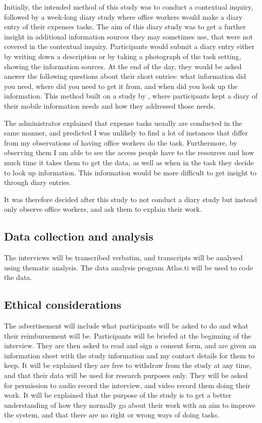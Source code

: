 \documentclass[11pt,oneside]{report}
\begin{document}
Initially, the intended method of this study was to conduct a contextual inquiry, followed by a week-long diary study where office workers would make a diary entry of their expenses tasks. The aim of this diary study was to get a further insight in additional information sources they may sometimes use, that were not covered in the contextual inquiry.  Participants would submit a diary entry either by writing down a description or by taking a photograph of the task setting, showing the information sources. At the end of the day, they would be asked answer the following questions about their short entries: what information did you need, where did you need to get it from, and when did you look up the information. This method built on a study by \citet{Sohn2008}, where participants kept a diary of their mobile information needs and how they addressed those needs. 

The administrator explained that expense tasks usually are conducted in the same manner, and predicted I was unlikely to find a lot of instances that differ from my observations of having office workers do the task.
Furthermore, by observing them I am able to see the access people have to the resources and how much time it takes them to get the data, as well as when in the task they decide to look up information. This information would be more difficult to get insight to through diary entries.

It was therefore decided after this study to not conduct a diary study but instead only observe office workers, and ask them to explain their work.

\subsection{Data collection and analysis}
The interviews will be transcribed verbatim, and transcripts will be analysed using thematic analysis. The data analysis program Atlas.ti will be used to code the data.

\subsection{Ethical considerations}
The advertisement will include what participants will be asked to do and what their reimbursement will be. 
Participants will be briefed at the beginning of the interview. They are then asked to read and sign a consent form, and are given an information sheet with the study information and my contact details for them to keep. 
It will be explained they are free to withdraw from the study at any time, and that their data will be used for research purposes only. They will be asked for permission to audio record the interview, and video record them doing their work. It will be explained that the purpose of the study is to get a better understanding of how they normally go about their work with an aim to improve the system, and that there are no right or wrong ways of doing tasks. 
\end{document}
